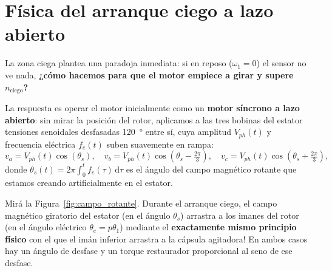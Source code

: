 \documentclass[11pt,a4paper,oneside]{book}
\newcommand{\dd}{\mathrm{d}}
\begin{document}
\section{Física del arranque ciego a lazo abierto}

La zona ciega plantea una paradoja inmediata: si en reposo ($\omega_1 = 0$) el
sensor no ve nada, \textbf{¿cómo hacemos para que el motor empiece a girar y
supere $n_{\text{ciego}}$?}

La respuesta es operar el motor inicialmente como un \textbf{motor síncrono a
lazo abierto}: sin mirar la posición del rotor, aplicamos a las tres bobinas del
estator tensiones senoidales desfasadas \SI{120}{\degree} entre sí, cuya
amplitud $V_{ph}(t)$ y frecuencia eléctrica $f_e(t)$ suben suavemente en rampa:
\begin{equation}
  v_a = V_{ph}(t)\cos(\theta_s), \quad
  v_b = V_{ph}(t)\cos\!\left(\theta_s - \tfrac{2\pi}{3}\right), \quad
  v_c = V_{ph}(t)\cos\!\left(\theta_s + \tfrac{2\pi}{3}\right),
  \label{eq:tensiones_arranque}
\end{equation}
donde $\theta_s(t) = 2\pi\int_0^t f_e(\tau)\,\dd\tau$ es el ángulo del campo
magnético rotante que estamos creando artificialmente en el estator.

\begin{ideafisica}
Mirá la Figura~\ref{fig:campo_rotante}. Durante el arranque ciego, el campo
magnético giratorio del estator (en el ángulo $\theta_s$) arrastra a los imanes
del rotor (en el ángulo eléctrico $\theta_e = p\theta_1$) mediante el
\textbf{exactamente mismo principio físico} con el que el imán inferior arrastra
a la cápsula agitadora! En ambos casos hay un ángulo de desfase y un torque
restaurador proporcional al seno de ese desfase.
\end{ideafisica}
\end{document}
